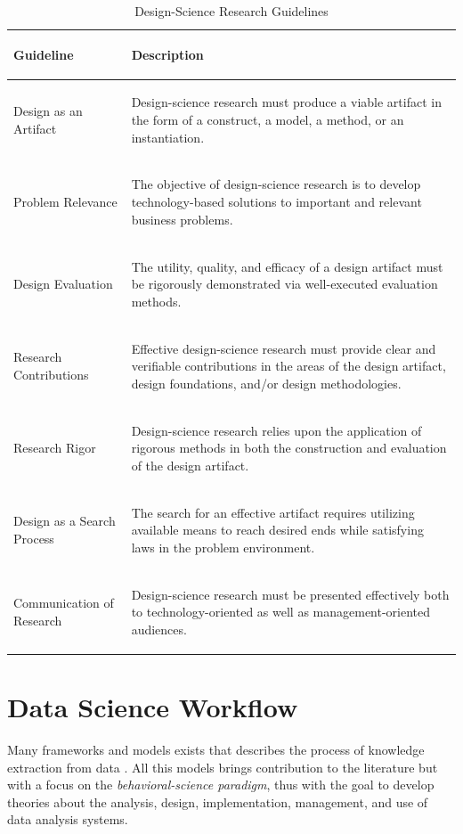 \documentclass[b5paper,]{book}
\theoremstyle{definition}
\theoremstyle{definition}
\theoremstyle{definition}
\theoremstyle{remark}
\begin{document}
\begin{table}

\caption{\label{tab:introdesignscience}Design-Science Research Guidelines}
\centering
\begin{tabular}[t]{>{}l>{\em\raggedright\arraybackslash}p{20em}}
\toprule
Guideline & Description\\
\midrule
Design as an Artifact & Design-science research must produce a viable artifact in the form of a construct, a model, a method, or an instantiation.\\
Problem Relevance & The objective of design-science research is to develop technology-based solutions to important and relevant business problems.\\
Design Evaluation & The utility, quality, and efficacy of a design artifact must be rigorously demonstrated via well-executed evaluation methods.\\
Research Contributions & Effective design-science research must provide clear and verifiable contributions in the areas of the design artifact, design foundations, and/or design methodologies.\\
Research Rigor & Design-science research relies upon the application of rigorous methods in both the construction and evaluation of the design artifact.\\
\addlinespace
Design as a Search Process & The search for an effective artifact requires utilizing available means to reach desired ends while satisfying laws in the problem environment.\\
Communication of Research & Design-science research must be presented effectively both to technology-oriented as well as management-oriented audiences.\\
\bottomrule
\end{tabular}
\end{table}

\section{Data Science Workflow}\label{data-science-workflow}

Many frameworks and models exists that describes the process of
knowledge extraction from data \citep[\citet{bellinger2004data},
\citet{ackoff1989data},
\citet{liew2007understanding}]{kanehisa2013data}. All this models brings
contribution to the literature but with a focus on the
\emph{behavioral-science paradigm}, thus with the goal to develop
theories about the analysis, design, implementation, management, and use
of data analysis systems.
\end{document}
